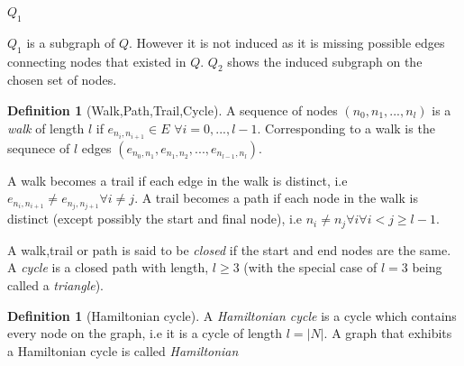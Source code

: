 \documentclass[a4paper,10pt]{article}
\theoremstyle{definition}
\newtheorem{definition}[theorem]{Definition}
\theoremstyle{definition}
\theoremstyle{remark}
\theoremstyle{definition}
\begin{document}
\begin{myfigure}
\begin{center}
\begin{submyfigure}{.3\textwidth}
\begin{center}
\end{center}
\caption{$Q_{1}$}
\label{subexamplefigure: induced subgraph}
\end{submyfigure}
\caption{ $Q_{1}$ is a subgraph of $Q$. However it is not induced as it is missing possible edges connecting nodes that existed in $Q$. $Q_{2}$ shows the induced subgraph on the chosen set of nodes. }
\end{center}
\label{examplefigure: subgraph example}
\end{myfigure}

\begin{definition}[Walk,Path,Trail,Cycle]
A sequence of nodes $(n_{0},n_{1},...,n_{l})$ is a \textit{walk} of length $l$ if $e_{n_{i},n_{i+1}} \in E$ $\forall i=0,...,l-1$. Corresponding to a walk is the sequnece of $l$ edges $(e_{n_{0},n_{1}},e_{n_{1},n_{2}},...,e_{n_{l-1},n_{l}})$.

A walk becomes a trail if each edge in the walk is distinct, i.e $e_{n_{i},n_{i+1}} \neq e_{n_{j},n_{j+1}} \forall i \neq j$. A trail becomes a path if each node in the walk is distinct (except possibly the start and final node), i.e $n_{i} \neq n_{j} \forall i \forall i < j \geq l-1$.

A walk,trail or path is said to be \textit{closed} if the start and end nodes are the same. A \textit{cycle} is a closed path with length, $l \geq 3$ (with the special case of $l=3$ being called a \textit{triangle}).
\end{definition}

\begin{definition}[Hamiltonian cycle]
A \textit{Hamiltonian cycle} is a cycle which contains every node on the graph, i.e it is a cycle of length $l=|N|$. A graph that exhibits a Hamiltonian cycle is called \textit{Hamiltonian}
\end{definition}
\end{document}
